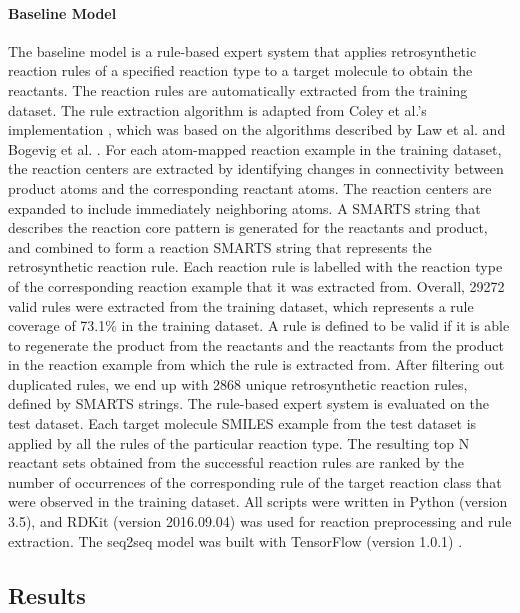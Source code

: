 \paragraph{Baseline Model}
The baseline model is a rule-based expert system that applies retrosynthetic reaction rules of a specified reaction type to a target molecule to obtain the reactants. The reaction rules are automatically extracted from the training dataset. The rule extraction algorithm is adapted from Coley et al.’s implementation \cite{coley2017prediction}, which was based on the algorithms described by Law et al. \cite{law2009route} and Bogevig et al. \cite{bogevig2015route}. For each atom-mapped reaction example in the training dataset, the reaction centers are extracted by identifying changes in connectivity between product atoms and the corresponding reactant atoms. The reaction centers are expanded to include immediately neighboring atoms. A SMARTS string that describes the reaction core pattern is generated for the reactants and product, and combined to form a reaction SMARTS string that represents the retrosynthetic reaction rule. Each reaction rule is labelled with the reaction type of the corresponding reaction example that it was extracted from. Overall, 29272 valid rules were extracted from the training dataset, which represents a rule coverage of 73.1\% in the training dataset. A rule is defined to be valid if it is able to regenerate the product from the reactants and the reactants from the product in the reaction example from which the rule is extracted from. After filtering out duplicated rules, we end up with 2868 unique retrosynthetic reaction rules, defined by SMARTS strings. 
The rule-based expert system is evaluated on the test dataset. Each target molecule SMILES example from the test dataset is applied by all the rules of the particular reaction type. The resulting top N reactant sets obtained from the successful reaction rules are ranked by the number of occurrences of the corresponding rule of the target reaction class that were observed in the training dataset.
All scripts were written in Python (version 3.5), and RDKit (version 2016.09.04) \cite{landrumrdkit} was used for reaction preprocessing and rule extraction. The seq2seq model was built with TensorFlow (version 1.0.1) \cite{abadi2016tensorflow}.

\subsection{Results}

